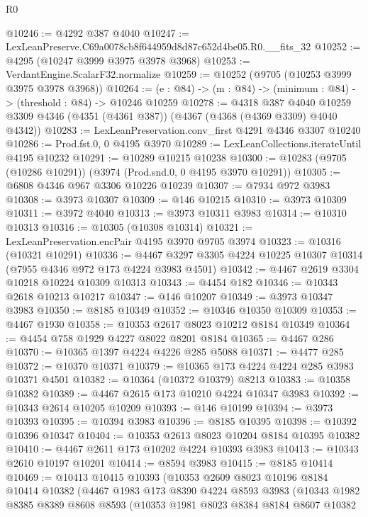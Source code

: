 \begin{lexlean}{R0}
\begin{coremodule}
@10246 := @4292 @387 @4040
@10247 := LexLeanPreserve.C69a0078cb8f644959d8d87c652d4be05.R0.__fits_32
@10252 := @4295 (@10247 @3999 @3975 @3978 @3968)
@10253 := VerdantEngine.ScalarF32.normalize
@10259 := @10252 (@9705 (@10253 @3999 @3975 @3978 @3968))
@10264 := (e : @84) -> (m : @84) -> (minimum : @84) -> (threshold : @84) -> @10246 @10259
@10278 := @4318
    @387
    @4040
    @10259
    @3309
    @4346
    (@4351 (@4361 @387))
    (@4367 (@4368 (@4369 @3309) @4040 @4342))
@10283 := LexLeanPreservation.conv_first @4291 @4346 @3307 @10240
@10286 := Prod.fst.{0, 0} @4195 @3970
@10289 := LexLeanCollections.iterateUntil @4195 @10232
@10291 := @10289 @10215 @10238
@10300 := @10283 (@9705 (@10286 @10291)) (@3974 (Prod.snd.{0, 0} @4195 @3970 @10291))
@10305 := @6808 @4346 @967 @3306 @10226 @10239
@10307 := @7934 @972 @3983
@10308 := @3973 @10307
@10309 := @146 @10215
@10310 := @3973 @10309
@10311 := @3972 @4040
@10313 := @3973 @10311 @3983
@10314 := @10310 @10313
@10316 := @10305 (@10308 @10314)
@10321 := LexLeanPreservation.encPair @4195 @3970 @9705 @3974
@10323 := @10316 (@10321 @10291)
@10336 := @4467 @3297 @3305 @4224 @10225 @10307 @10314 (@7955 @4346 @972 @173 @4224 @3983 @4501)
@10342 := @4467 @2619 @3304 @10218 @10224 @10309 @10313
@10343 := @4454 @182
@10346 := @10343 @2618 @10213 @10217
@10347 := @146 @10207
@10349 := @3973 @10347 @3983
@10350 := @8185 @10349
@10352 := @10346 @10350 @10309
@10353 := @4467 @1930
@10358 := @10353 @2617 @8023 @10212 @8184 @10349
@10364 := @4454 @758 @1929 @4227 @8022 @8201 @8184
@10365 := @4467 @286
@10370 := @10365 @1397 @4224 @4226 @285 @5088
@10371 := @4477 @285
@10372 := @10370 @10371
@10379 := @10365 @173 @4224 @4224 @285 @3983 @10371 @4501
@10382 := @10364 (@10372 @10379) @8213
@10383 := @10358 @10382
@10389 := @4467 @2615 @173 @10210 @4224 @10347 @3983
@10392 := @10343 @2614 @10205 @10209
@10393 := @146 @10199
@10394 := @3973 @10393
@10395 := @10394 @3983
@10396 := @8185 @10395
@10398 := @10392 @10396 @10347
@10404 := @10353 @2613 @8023 @10204 @8184 @10395 @10382
@10410 := @4467 @2611 @173 @10202 @4224 @10393 @3983
@10413 := @10343 @2610 @10197 @10201
@10414 := @8594 @3983
@10415 := @8185 @10414
@10469 := @10413
    @10415
    @10393
    (@10353
      @2609
      @8023
      @10196
      @8184
      @10414
      @10382
      (@4467
        @1983
        @173
        @8390
        @4224
        @8593
        @3983
        (@10343
          @1982
          @8385
          @8389
          @8608
          @8593
          (@10353
            @1981
            @8023
            @8384
            @8184
            @8607
            @10382

\end{coremodule}
\end{lexlean}

